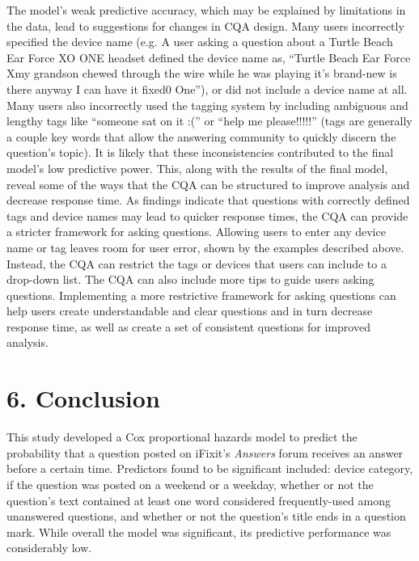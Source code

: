 \documentclass{article}
\begin{document}
The model's weak predictive accuracy, which may be explained by limitations in the data, lead to suggestions for changes in CQA design. Many users incorrectly specified the device name (e.g. A user asking a question about a Turtle Beach Ear Force XO ONE headset defined the device name as, ``Turtle Beach Ear Force Xmy grandson chewed through the wire while he was playing it's brand-new is there anyway I can have it fixed0 One''), or did not include a device name at all. Many users also incorrectly used the tagging system by including ambiguous and lengthy tags like ``someone sat on it :('' or ``help me please!!!!!'' (tags are generally a couple key words that allow the answering community to quickly discern the question's topic). It is likely that these inconsistencies contributed to the final model's low predictive power. This, along with the results of the final model, reveal some of the ways that the CQA can be structured to improve analysis and decrease response time. As findings indicate that questions with correctly defined tags and device names may lead to quicker response times, the CQA can provide a stricter framework for asking questions. Allowing users to enter any device name or tag leaves room for user error, shown by the examples described above. Instead, the CQA can restrict the tags or devices that users can include to a drop-down list. The CQA can also include more tips to guide users asking questions. Implementing a more restrictive framework for asking questions can help users create understandable and clear questions and in turn decrease response time, as well as create a set of consistent questions for improved analysis. 


\section*{6. Conclusion}

This study developed a Cox proportional hazards model to predict the probability that a question posted on iFixit's \textit{Answers} forum receives an answer before a certain time. Predictors found to be significant included: device category, if the question was posted on a weekend or a weekday, whether or not the question's text contained at least one word considered frequently-used among unanswered questions, and whether or not the question's title ends in a question mark. While overall the model was significant, its predictive performance was considerably low. 
\end{document}

